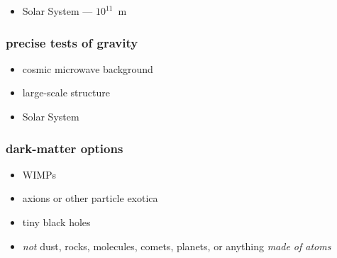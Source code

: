 \documentclass{beamer}
\begin{document}
\begin{frame}
\begin{itemize}
\item Solar System --- $10^11$~m
\end{itemize}
\end{frame}

\begin{frame}
\frametitle{precise tests of gravity}
\begin{itemize}
\item cosmic microwave background
\item large-scale structure
\item Solar System
\end{itemize}
\end{frame}

\begin{frame}
\frametitle{dark-matter options}
\begin{itemize}
\item WIMPs
\item axions or other particle exotica
\item tiny black holes
\item \emph{not} dust, rocks, molecules, comets, planets, or anything \emph{made of atoms}
\end{itemize}
\end{frame}

{\begin{frame}[plain]~\end{frame}}

{\begin{frame}[plain]~\end{frame}}
\end{document}
